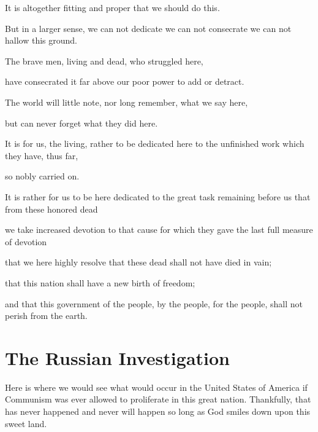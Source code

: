 \documentclass{article}
\begin{document}
It is altogether fitting and proper that we should do this.

But in a larger sense, we can not dedicate we can not consecrate we can not hallow this ground. 

The brave men, living and dead, who struggled here, 

have consecrated it far above our poor power to add or detract. 

The world will little note, nor long remember, what we say here, 

but can never forget what they did here.

It is for us, the living, rather to be dedicated here to the unfinished work which they have, thus far, 

so nobly carried on. 



It is rather for us to be here dedicated to the great task remaining before us that from these honored dead 

we take increased devotion to that cause for which they gave the last full measure of devotion 

that we here highly resolve that these dead shall not have died in vain; 

that this nation shall have a new birth of freedom; 

and that this government of the people, by the people, for the people, shall not perish from the earth.

\section{The Russian Investigation}

Here is where we would see what would occur in the United States of America if Communism was ever allowed to proliferate in this great nation. Thankfully, that has never happened and never will happen so long as God smiles down upon this sweet land.
\end{document}
